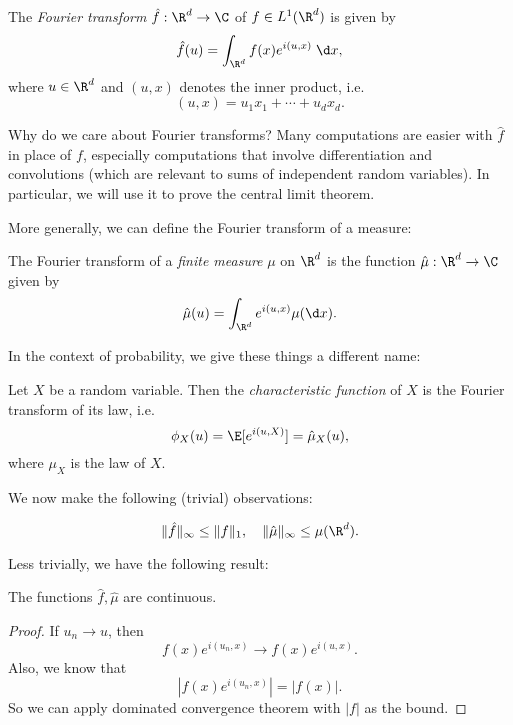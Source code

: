 \documentclass[a4paper]{article}
\begin{document}
\begin{defi}
  The \emph{Fourier transform} $\hat{f}: \R^d \to \C$ of $f \in L^1(\R^d)$ is given by
  \[
    \hat{f}(u) = \int_{\R^d}f(x) e^{i (u, x)}\;\d x,
  \]
  where $u \in \R^d$ and $(u, x)$ denotes the inner product, i.e.
  \[
    (u, x) = u_1 x_1 + \cdots + u_d x_d.
  \]
\end{defi}

Why do we care about Fourier transforms? Many computations are easier with $\hat{f}$ in place of $f$, especially computations that involve differentiation and convolutions (which are relevant to sums of independent random variables). In particular, we will use it to prove the central limit theorem.

More generally, we can define the Fourier transform of a measure:

\begin{defi}
  The Fourier transform of a \emph{finite measure} $\mu$ on $\R^d$ is the function $\hat{\mu}: \R^d \to \C$ given by
  \[
    \hat{\mu}(u) = \int_{\R^d} e^{i(u, x)} \mu(\d x).
  \]
\end{defi}

In the context of probability, we give these things a different name:
\begin{defi}
  Let $X$ be a random variable. Then the \emph{characteristic function} of $X$ is the Fourier transform of its law, i.e.
  \[
    \phi_X(u) = \E[e^{i(u, X)}] = \hat{\mu}_X(u),
  \]
  where $\mu_X$ is the law of $X$.
\end{defi}

We now make the following (trivial) observations:
\begin{prop}
  \[
    \|\hat{f}\|_\infty \leq \|f\|_1, \quad \|\hat{\mu}\|_\infty \leq \mu(\R^d).
  \]
\end{prop}

Less trivially, we have the following result:
\begin{prop}
  The functions $\hat{f}, \hat{\mu}$ are continuous.
\end{prop}

\begin{proof}
  If $u_n \to u$, then
  \[
    f(x) e^{i(u_n, x)} \to f(x) e^{i(u, x)}.
  \]
  Also, we know that
  \[
    |f(x) e^{i(u_n, x)}| = |f(x)|.
  \]
  So we can apply dominated convergence theorem with $|f|$ as the bound.
\end{proof}
\end{document}
